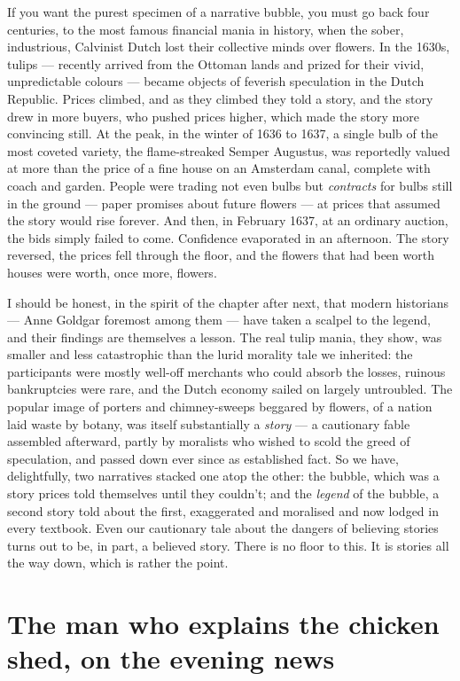 If you want the purest specimen of a narrative bubble, you must go back four centuries, to the most famous financial mania in history, when the sober, industrious, Calvinist Dutch lost their collective minds over flowers. In the 1630s, tulips — recently arrived from the Ottoman lands and prized for their vivid, unpredictable colours — became objects of feverish speculation in the Dutch Republic. Prices climbed, and as they climbed they told a story, and the story drew in more buyers, who pushed prices higher, which made the story more convincing still. At the peak, in the winter of 1636 to 1637, a single bulb of the most coveted variety, the flame-streaked Semper Augustus, was reportedly valued at more than the price of a fine house on an Amsterdam canal, complete with coach and garden. People were trading not even bulbs but \emph{contracts} for bulbs still in the ground — paper promises about future flowers — at prices that assumed the story would rise forever. And then, in February 1637, at an ordinary auction, the bids simply failed to come. Confidence evaporated in an afternoon. The story reversed, the prices fell through the floor, and the flowers that had been worth houses were worth, once more, flowers.

I should be honest, in the spirit of the chapter after next, that modern historians — Anne Goldgar foremost among them — have taken a scalpel to the legend, and their findings are themselves a lesson. The real tulip mania, they show, was smaller and less catastrophic than the lurid morality tale we inherited: the participants were mostly well-off merchants who could absorb the losses, ruinous bankruptcies were rare, and the Dutch economy sailed on largely untroubled. The popular image of porters and chimney-sweeps beggared by flowers, of a nation laid waste by botany, was itself substantially a \emph{story} — a cautionary fable assembled afterward, partly by moralists who wished to scold the greed of speculation, and passed down ever since as established fact. So we have, delightfully, two narratives stacked one atop the other: the bubble, which was a story prices told themselves until they couldn't; and the \emph{legend} of the bubble, a second story told about the first, exaggerated and moralised and now lodged in every textbook. Even our cautionary tale about the dangers of believing stories turns out to be, in part, a believed story. There is no floor to this. It is stories all the way down, which is rather the point.

\section*{The man who explains the chicken shed, on the evening news}

